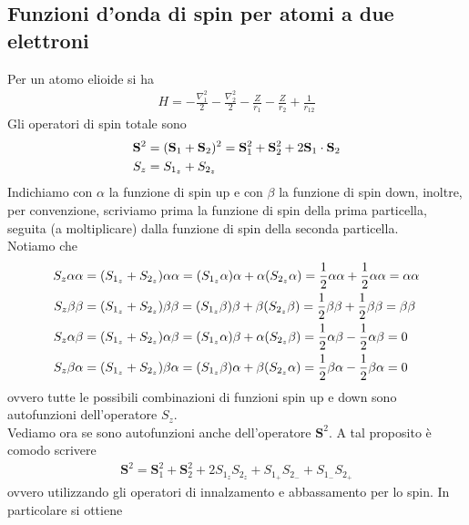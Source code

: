 \documentclass{article}
\begin{document}
\newpage
\subsection{Funzioni d'onda di spin per atomi a due elettroni}
Per un atomo elioide si ha 
\begin{align}
    H = -\frac{\nabla^2_1}{2} - \frac{\nabla^2_2}{2} - \frac{Z}{r_1} - \frac{Z}{r_2} + \frac{1}{r_{12}} \tag{2.2.1}
\end{align}
Gli operatori di spin totale sono 
\begin{align}
    \mathbf{S}^2 &= (\mathbf{S}_1 + \mathbf{S}_2)^2 = \mathbf{S}^2_1 + \mathbf{S}^2_2 + 2\mathbf{S}_1 \cdot \mathbf{S}_2 \notag \\
    S_z &= S_{1_z} + S_{2_z} \notag
\end{align}
Indichiamo con $\alpha$ la funzione di spin up e con $\beta$ la funzione di spin down, inoltre, per convenzione, scriviamo prima la funzione di spin della prima particella, seguita (a moltiplicare) dalla funzione di spin della seconda particella. \\
Notiamo che 
\begin{align}
    S_z \alpha\alpha &= (S_{1_z} + S_{2_z})\alpha\alpha = (S_{1_z}\alpha)\alpha + \alpha(S_{2_z}\alpha) = \frac{1}{2}\alpha\alpha + \frac{1}{2}\alpha\alpha = \alpha\alpha \notag \\
    S_z \beta\beta &= (S_{1_z} + S_{2_z})\beta\beta = (S_{1_z}\beta)\beta + \beta(S_{2_z}\beta) = \frac{1}{2}\beta\beta + \frac{1}{2}\beta\beta = \beta\beta \notag \\
    S_z \alpha\beta &= (S_{1_z} + S_{2_z})\alpha\beta = (S_{1_z}\alpha)\beta + \alpha(S_{2_z}\beta) = \frac{1}{2}\alpha\beta - \frac{1}{2}\alpha\beta = 0 \notag \\
    S_z \beta\alpha &= (S_{1_z} + S_{2_z})\beta\alpha = (S_{1_z}\beta)\alpha + \beta(S_{2_z}\alpha) = \frac{1}{2}\beta\alpha - \frac{1}{2}\beta\alpha = 0 \notag
\end{align}
ovvero tutte le possibili combinazioni di funzioni spin up e down sono autofunzioni dell'operatore $S_z$. \\
Vediamo ora se sono autofunzioni anche dell'operatore $\mathbf{S}^2$. A tal proposito è comodo scrivere 
\begin{align}
    \mathbf{S}^2 = \mathbf{S}^2_1 + \mathbf{S}^2_2 + 2S_{1_z}S_{2_z} + S_{1_+}S_{2_-} + S_{1_-}S_{2_+} \tag{2.2.2}
\end{align}
ovvero utilizzando gli operatori di innalzamento e abbassamento per lo spin. In particolare si ottiene 
\end{document}
